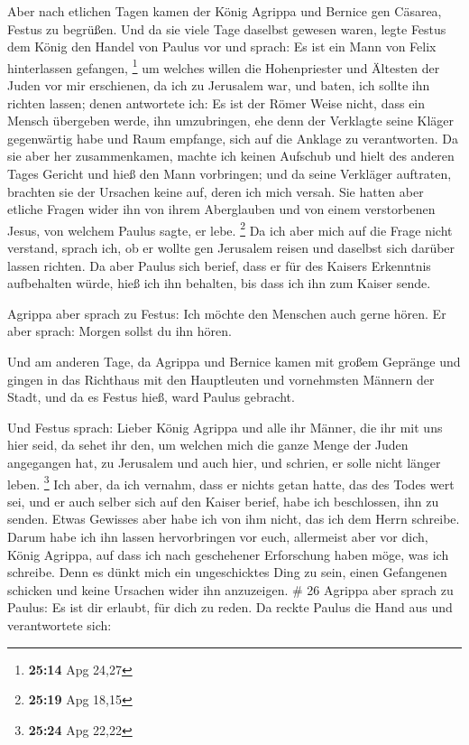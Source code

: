  Aber nach etlichen Tagen kamen der König Agrippa und
Bernice gen Cäsarea, Festus zu begrüßen.  Und da sie
viele Tage daselbst gewesen waren, legte Festus dem König den Handel von
Paulus vor und sprach: Es ist ein Mann von Felix hinterlassen gefangen,
\footnote{\textbf{25:14} Apg 24,27}  um welches willen
die Hohenpriester und Ältesten der Juden vor mir erschienen, da ich zu
Jerusalem war, und baten, ich sollte ihn richten lassen; 
denen antwortete ich: Es ist der Römer Weise nicht, dass ein Mensch
übergeben werde, ihn umzubringen, ehe denn der Verklagte seine Kläger
gegenwärtig habe und Raum empfange, sich auf die Anklage zu
verantworten.  Da sie aber her zusammenkamen, machte ich
keinen Aufschub und hielt des anderen Tages Gericht und hieß den Mann
vorbringen;  und da seine Verkläger auftraten, brachten
sie der Ursachen keine auf, deren ich mich versah.  Sie
hatten aber etliche Fragen wider ihn von ihrem Aberglauben und von einem
verstorbenen Jesus, von welchem Paulus sagte, er lebe. \footnote{\textbf{25:19}
  Apg 18,15}  Da ich aber mich auf die Frage nicht
verstand, sprach ich, ob er wollte gen Jerusalem reisen und daselbst
sich darüber lassen richten.  Da aber Paulus sich berief,
dass er für des Kaisers Erkenntnis aufbehalten würde, hieß ich ihn
behalten, bis dass ich ihn zum Kaiser sende.

 Agrippa aber sprach zu Festus: Ich möchte den Menschen
auch gerne hören. Er aber sprach: Morgen sollst du ihn hören.

 Und am anderen Tage, da Agrippa und Bernice kamen mit
großem Gepränge und gingen in das Richthaus mit den Hauptleuten und
vornehmsten Männern der Stadt, und da es Festus hieß, ward Paulus
gebracht.

 Und Festus sprach: Lieber König Agrippa und alle ihr
Männer, die ihr mit uns hier seid, da sehet ihr den, um welchen mich die
ganze Menge der Juden angegangen hat, zu Jerusalem und auch hier, und
schrien, er solle nicht länger leben. \footnote{\textbf{25:24} Apg 22,22}
 Ich aber, da ich vernahm, dass er nichts getan hatte,
das des Todes wert sei, und er auch selber sich auf den Kaiser berief,
habe ich beschlossen, ihn zu senden.  Etwas Gewisses aber
habe ich von ihm nicht, das ich dem Herrn schreibe. Darum habe ich ihn
lassen hervorbringen vor euch, allermeist aber vor dich, König Agrippa,
auf dass ich nach geschehener Erforschung haben möge, was ich schreibe.
 Denn es dünkt mich ein ungeschicktes Ding zu sein, einen
Gefangenen schicken und keine Ursachen wider ihn anzuzeigen. \# 26
 Agrippa aber sprach zu Paulus: Es ist dir erlaubt, für
dich zu reden. Da reckte Paulus die Hand aus und verantwortete sich:

